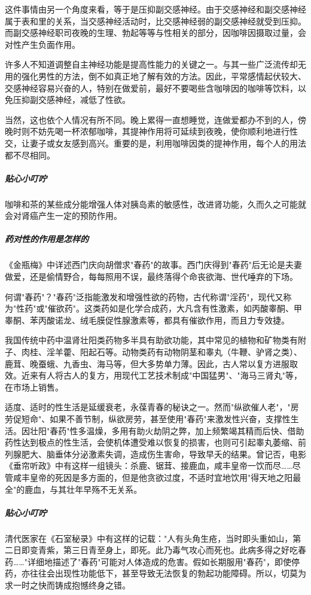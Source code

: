 这件事情由另一个角度来看，等于是压抑副交感神经。由于交感神经和副交感神经属于表和里的关系，当交感神经活动时，比交感神经弱的副交感神经就受到压抑。而副交感神经职司夜晚的生理、勃起等等与性相关的部分，因咖啡因摄取过量，会对性产生负面作用。

许多人不知道调整自主神经功能是提高性能力的关键之一。与其一些广泛流传却无用的强化男性的方法，倒不如真正地了解有效的方法。因此，平常感情起伏较大、交感神经容易兴奋的人，特别在做爱前，最好不要喝些含咖啡因的咖啡等饮料，以免压抑副交感神经，减低了性欲。

当然，这也依个人情况有所不同。晚上累得一直想睡觉，连做爱都办不到的人，傍晚时则不妨先喝一杯浓郁咖啡，其提神作用将可延续到夜晚，使你顺利地进行性交，让妻子或女友感到高兴。重要的是，利用咖啡因类的提神作用，每个人的用法都不尽相同。

\subparagraph{贴心小叮咛}

咖啡和茶的某些成分能增强人体对胰岛素的敏感性，改进肾功能，久而久之可能就会对肾癌产生一定的预防作用。

\subparagraph{药对性的作用是怎样的}

《金瓶梅》中详述西门庆向胡僧求"春药"的故事。西门庆得到"春药"后无论是夫妻做爱，还是偷情野合，每每照用不误，最终落得个命丧欲海、世代唾弃的下场。

何谓"春药"？"春药"泛指能激发和增强性欲的药物，古代称谓"淫药"，现代又称为"性药"或"催欲药"。这类药如是化学合成药，大凡含有性激素，如丙酸睾酮、甲睾酮、苯丙酸诺龙、绒毛膜促性腺激素等，都具有催欲作用，而且力专效捷。

我国传统中药中温肾壮阳类药物多半具有助欲功能，其中常见的植物和矿物类有附子、肉桂、淫羊藿、阳起石等。动物类药有动物阴茎和睾丸（牛鞭、驴肾之类）、鹿茸、晚蚕蛾、九香虫、海马等，但大多势单力薄。因此，古人常以复方进服取效。近来有人将古人的复方，用现代工艺技术制成"中国猛男"、"海马三肾丸"等，在市场上销售。

适度、适时的性生活是延缓衰老，永葆青春的秘诀之一。然而"纵欲催人老"，"房劳促短命"、如果不善节制，纵欲房劳，甚至使用"春药"来激发性兴奋，支撑性生活。因壮阳"春药"性多温燥，多用有助火劫阴之弊，加上频繁竭其精而后快、借助药性达到极点的性生活，会使机体遭受难以恢复的损害，也则可引起睾丸萎缩、前列腺肥大、脑垂体分泌激素失调，造成伤生害命，导致早夭的结果。曾记否，电影《垂帘听政》中有这样一组镜头：杀鹿、锯茸、接鹿血，咸丰皇帝一饮而尽……尽管咸丰皇帝的死因是多方面的，但是他贪欲过度，不适时宜地饮用"得天地之阳最全"的鹿血，与其壮年早殇不无关系。

\subparagraph{贴心小叮咛}

清代医家在《石室秘录》中有这样的记载："人有头角生疮，当时即头重如山，第二日即变青紫，第三日青至身上，即死。此乃毒气攻心而死也。此病多得之好吃春药……"详细地描述了"春药"可能对人体造成的危害。假如长期服用"春药"，即使停药，亦往往会出现性功能低下，甚至导致无法恢复的勃起功能障碍。所以，切莫为求一时之快而铸成抱憾终身之错。

